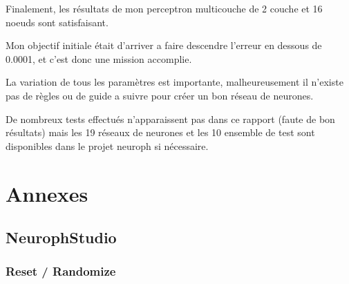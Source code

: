\documentclass[10pt]{report}
\begin{document}
Finalement, les résultats de mon perceptron multicouche de 2 couche et 16 noeuds sont satisfaisant. 

Mon objectif initiale était d'arriver a faire descendre l'erreur en dessous de 0.0001, et c'est donc une mission accomplie.

La variation de tous les paramètres est importante, malheureusement il n'existe pas de règles ou de guide a suivre pour créer un bon réseau de neurones.

De nombreux tests effectués n'apparaissent pas dans ce rapport (faute de bon résultats) mais les 19 réseaux de neurones et les 10 ensemble de test sont disponibles dans le projet neuroph si nécessaire.

\chapter{Annexes}
\section{NeurophStudio}
\subsection{Reset / Randomize}
\end{document}
